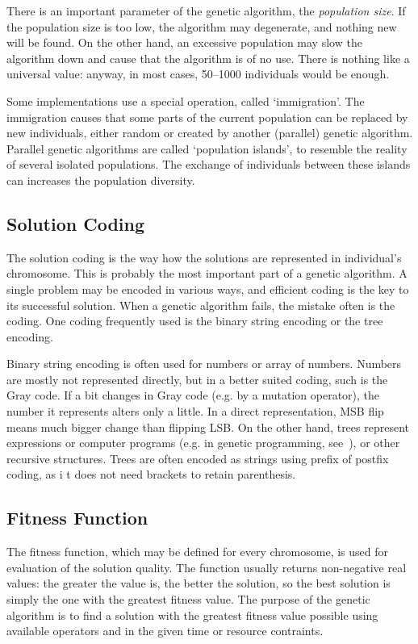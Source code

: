 There is an important parameter of the genetic algorithm, the {\em population size}. If the population size is too low, the algorithm may degenerate, and nothing new will be found. On the other hand, an excessive population may slow the algorithm down and cause that the algorithm is of no use. There is nothing like a universal value: anyway, in most cases, 50--1000 individuals would be enough.

Some implementations use a special operation, called `immigration'. The immigration causes that some parts of the current population can be replaced by new individuals, either random or created by another (parallel) genetic algorithm. Parallel genetic algorithms are called `population islands', to resemble the reality of several isolated populations. The exchange of individuals between these islands can increases the population diversity.

\subsection{Solution Coding}

The solution coding is the way how the solutions are represented in individual's chromosome. This is probably the most important part of a genetic algorithm. A single problem may be encoded in various ways, and efficient coding is the key to its successful solution. When a genetic algorithm fails, the mistake often is the coding. One coding frequently used is the binary string encoding or the tree encoding.

Binary string encoding is often used for numbers or array of numbers. Numbers are mostly not represented directly, but in a better suited coding, such is the Gray code. If a bit changes in Gray code (e.g. by a mutation operator), the number it represents alters only a little. In a direct representation, MSB flip means much bigger change than flipping LSB. On the other hand, trees represent expressions or computer programs (e.g. in genetic programming, see~\cite{koza}), or other recursive structures. Trees are often encoded as strings using prefix of postfix coding, as i t does not need brackets to retain parenthesis.

\subsection{Fitness Function}

The fitness function, which may be defined for every chromosome, is used for evaluation of the solution quality. The function usually returns non-negative real values: the greater the value is, the better the solution, so the best solution is simply the one with the greatest fitness value. The purpose of the genetic algorithm is to find a solution with the greatest fitness value possible using available operators and in the given time or resource contraints.


